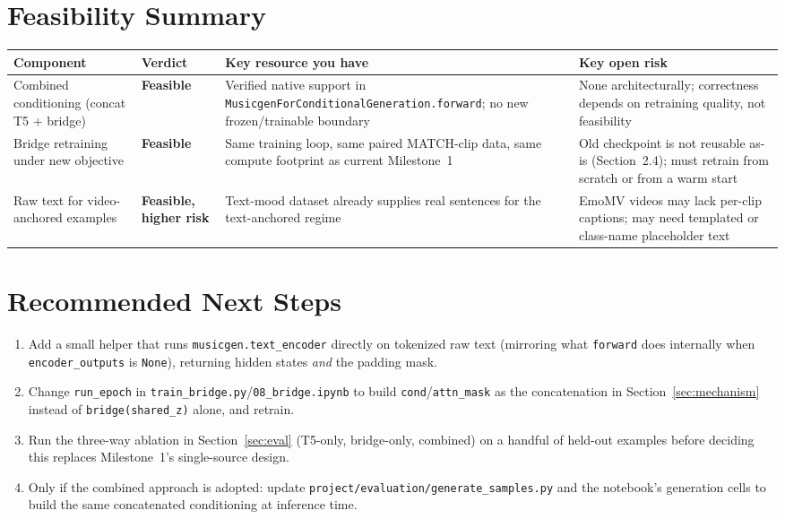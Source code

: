 \documentclass[11pt]{article}
\newcommand{\good}{\textcolor{green!50!black}{\textbf{Feasible}}}
\newcommand{\risky}{\textcolor{orange!80!black}{\textbf{Feasible, higher risk}}}
\begin{document}
\section{Feasibility Summary}

\begin{center}
\begin{tabularx}{\textwidth}{@{}>{\raggedright\arraybackslash}p{3.2cm} l X X@{}}
\toprule
\textbf{Component} & \textbf{Verdict} & \textbf{Key resource you have} & \textbf{Key open risk} \\
\midrule
Combined conditioning (concat T5 + bridge) &
\good &
Verified native support in \texttt{MusicgenForConditionalGeneration.forward}; no new frozen/trainable boundary &
None architecturally; correctness depends on retraining quality, not feasibility \\
\addlinespace
Bridge retraining under new objective &
\good &
Same training loop, same paired MATCH-clip data, same compute footprint as current Milestone~1 &
Old checkpoint is not reusable as-is (Section~2.4); must retrain from scratch or from a warm start \\
\addlinespace
Raw text for video-anchored examples &
\risky &
Text-mood dataset already supplies real sentences for the text-anchored regime &
EmoMV videos may lack per-clip captions; may need templated or class-name placeholder text \\
\bottomrule
\end{tabularx}
\end{center}

\section{Recommended Next Steps}
\begin{enumerate}
\item Add a small helper that runs \texttt{musicgen.text\_encoder} directly on tokenized raw text
(mirroring what \texttt{forward} does internally when \texttt{encoder\_outputs} is \texttt{None}),
returning hidden states \emph{and} the padding mask.
\item Change \texttt{run\_epoch} in \texttt{train\_bridge.py}/\texttt{08\_bridge.ipynb} to build
\texttt{cond}/\texttt{attn\_mask} as the concatenation in Section~\ref{sec:mechanism} instead of
\texttt{bridge(shared\_z)} alone, and retrain.
\item Run the three-way ablation in Section~\ref{sec:eval} (T5-only, bridge-only, combined) on a
handful of held-out examples before deciding this replaces Milestone~1's single-source design.
\item Only if the combined approach is adopted: update
\texttt{project/evaluation/generate\_samples.py} and the notebook's generation cells to build the
same concatenated conditioning at inference time.
\end{enumerate}
\end{document}
